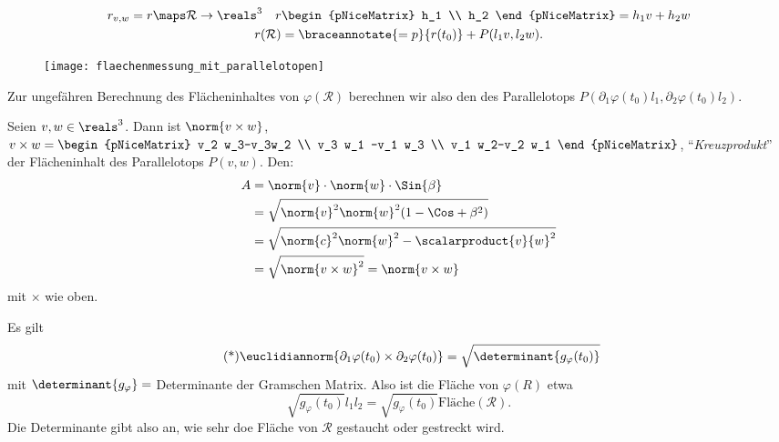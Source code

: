 \begin{frage}
\begin{eigenschaftenenumerate}
    \begin{gather*}
      r_{v,w}=r\maps \mathcal{R}\to \reals^3\quad r\begin{pNiceMatrix} h_1 \\ h_2 \end{pNiceMatrix}=h_1 v+ h_2 w\\
      r(\mathcal{R})=\braceannotate{=p}{r(t_0)}+P(l_1 v, l_2 w).
    \end{gather*}
    \begin{figure}[H]
      \centering
      \texttt{[image: flaechenmessung\_mit\_parallelotopen]}
      \label{fig:flaechenmessung_mit_parallelotopen}
    \end{figure}
    Zur ungefähren Berechnung des Flächeninhaltes von \( \varphi(\mathcal{R}) \) berechnen wir also den des Parallelotops \( P(\partial_1 \varphi(t_0)l_1,\partial_2 \varphi(t_0)l_2) \).
    \item Seien \( v,w\in \reals^3 \). Dann ist \( \norm{v\times w} \), \( v\times w=\begin{pNiceMatrix} v_2 w_3-v_3w_2 \\ v_3 w_1 -v_1 w_3 \\ v_1 w_2-v_2 w_1 \end{pNiceMatrix} \), \enquote{\emph{Kreuzprodukt}} der Flächeninhalt des Parallelotops \( P(v,w) \). Den:
    \begin{align*}
      A&=\norm{v}\cdot\norm{w}\cdot\Sin{\beta}\\
      &=\sqrt{\norm{v}^2\norm{w}^2(1-\Cos+{\beta}^2)}\\
      &=\sqrt{\norm{c}^2\norm{w}^2-\scalarproduct{v}{w}^2}\\
      &=\sqrt{\norm{v\times w}^2}=\norm{v\times w}
    \end{align*}
    mit \( \times \) wie oben.
    \item Es gilt
    \begin{equation*}
      \label{eq:flaecheninhalt_durch_determinante_gegeben}\tag{*} \euclidiannorm{\partial_1 \varphi(t_0)\times\partial_2 \varphi(t_0)}=\sqrt{\determinant{g_{\varphi}(t_0)}}
    \end{equation*}
    mit \( \determinant{g_{\varphi}}= \) Determinante der Gramschen Matrix. Also ist die Fläche von \( \varphi(R) \) etwa 
    \begin{equation*}
      \sqrt{g_{\varphi}(t_0)}l_1 l_2=\sqrt{g_{\varphi}(t_0)}\text{Fläche}(\mathcal{R}).
    \end{equation*}
    Die Determinante gibt also an, wie sehr doe Fläche von \( \mathcal{R} \) gestaucht oder gestreckt wird.


\end{eigenschaftenenumerate}
\end{frage}
